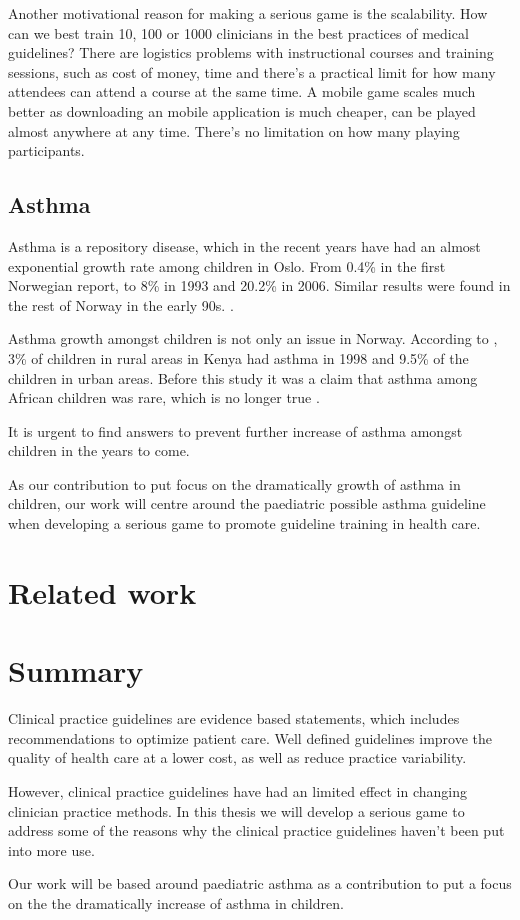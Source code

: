 Another motivational reason for making a serious game is the scalability. How can we best train 10, 100 or 1000 clinicians in the best practices of medical guidelines? There are logistics problems with instructional courses and training sessions, such as cost of money, time and there's a practical limit for how many attendees can attend a course at the same time. A mobile game scales much better as downloading an mobile application is much cheaper, can be played almost anywhere at any time. There's no limitation on how many playing participants.

\subsection{Asthma}
Asthma is a repository disease, which in the recent years have had an almost exponential growth rate among children in Oslo. From 0.4\% in the first Norwegian report, to 8\% in 1993 and 20.2\% in 2006. Similar results were found in the rest of Norway in the early 90s. \parencite{Carlsen2006}. 

Asthma growth amongst children is not only an issue in Norway. According to \textcite{Odhiambo1998}, 3\% of children in rural areas in Kenya had asthma in 1998 and 9.5\% of the children in urban areas. Before this study it was a claim that asthma among African children was rare, which is no longer true \parencite{Odhiambo1998}.

It is urgent to find answers to prevent further increase of asthma amongst children in the years to come\parencite{Carlsen2006}.

As our contribution to put focus on the dramatically growth of asthma in children, our work will centre around the paediatric possible asthma guideline \parencite{RepublicofKeny2016} when developing a serious game to promote guideline training in health care.


\section{Related work}
\section{Summary}
Clinical practice guidelines are evidence based statements, which includes recommendations to optimize patient care. Well defined guidelines improve the quality of health care at a lower cost, as well as reduce practice variability.

However, clinical practice guidelines have had an limited effect in changing clinician practice methods. In this thesis we will develop a serious game to address some of the reasons why the clinical practice guidelines haven't been put into more use.

Our work will be based around paediatric asthma as a contribution to put a focus on the the dramatically increase of asthma in children.